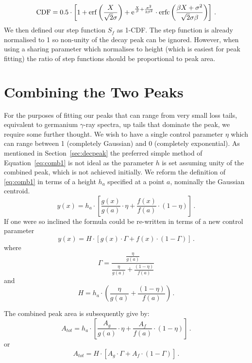 \documentclass[a4paper,10pt]{article}
\begin{document}
\begin{equation}
\mathrm{CDF}=
0.5\cdot
\left[
1
+
\mathrm{erf}\left(\frac{X}{\sqrt{2}\sigma}\right)
+
\mathrm{e}^{\frac{X}{\beta}+\frac{\sigma^2}{2\beta^2}}
\cdot
\mathrm{erfc}\left(\frac{\beta X+\sigma^2}{\sqrt{2}\sigma\beta}\right)\right]\,. \\
\end{equation}
We then defined our step function $S_{f}$ as 1-CDF. The step function is already normalised to 1 so non-unity of the decay peak can be ignored.
However, when using a sharing parameter which normalises to height (which is easiest for peak fitting) the ratio of step functions should be proportional to peak area.

\section{Combining the Two Peaks}

For the purposes of fitting our peaks that can range from very small loss tails, equivalent to germanium $\gamma$-ray spectra, up tails that dominate the peak, we require some further thought.
We wish to have a single control parameter $\eta$ which can range between 1 (completely Gaussian) and 0 (completely exponential). As mentioned in Section~\ref{sec:decpeak} the preferred simple method of Equation~\ref{eq:comb1} is not ideal as the parameter $h$ is set assuming unity of the combined peak, which is not achieved initially. We reform the definition of \ref{eq:comb1} in terms of a height $h_a$ specified at a point $a$, nominally the Gaussian centroid.
\begin{equation}
y(x) = h_a \cdot 
\left[
\frac{g(x)}{g(a)} \cdot\eta
+
\frac{f(x)}{f(a)}
\cdot(1-\eta)\right]\,.
\end{equation}
If one were so inclined the formula could be re-written in terms of a new control parameter
\begin{equation}
y(x) = H \cdot 
\left[
g(x)\cdot\Gamma
+
f(x)
\cdot(1-\Gamma)\right]\,.
\end{equation}
where
\begin{equation}
\Gamma=\frac{\frac{\eta}{g(a)}}{\frac{\eta}{g(a)} + \frac{(1-\eta)}{f(a)}}
\end{equation}
and
\begin{equation}
H=h_a \cdot\left( \frac{\eta}{g(a)} + \frac{(1-\eta)}{f(a)}\right)\,.
\end{equation}

The combined peak area is subsequently give by:
\begin{equation}
A_{tot} = h_a \cdot 
\left[
\frac{A_g}{g(a)} \cdot\eta
+
\frac{A_f}{f(a)}
\cdot(1-\eta)\right]\,.
\end{equation}
or
\begin{equation}
A_{tot} = H \cdot 
\left[
A_g\cdot\Gamma
+
A_f
\cdot(1-\Gamma)\right]\,.
\end{equation}
\end{document}
